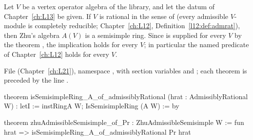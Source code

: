 \begin{theorem}\label{l15:thm:zhuss}
Let $V$ be a vertex operator algebra of the library, and let the datum  of Chapter~\ref{ch:L13} be given. If $V$ is
rational in the sense of  (every admissible $V$-module is completely reducible;
Chapter~\ref{ch:L12}, Definition~\ref{l12:def:admrat}), then Zhu's algebra $A(V)$ is a semisimple ring. Since  is
supplied for every $V$ by the theorem , the implication holds for every $V$; in particular the named predicate
 of Chapter~\ref{ch:L12} holds for every $V$.
\end{theorem}
\noindent File  (Chapter~\ref{ch:L21}), namespace
, with section variables 
and ; each theorem is preceded by the line
.
\begin{leancode}
theorem isSemisimpleRing_A_of_admissiblyRational (hrat : AdmissiblyRational W) :
    letI := instRingA W; IsSemisimpleRing (A W) := by

theorem zhuAdmissibleSemisimple_of_Pr : ZhuAdmissibleSemisimple W :=
  fun hrat => isSemisimpleRing_A_of_admissiblyRational Pr hrat
\end{leancode}

